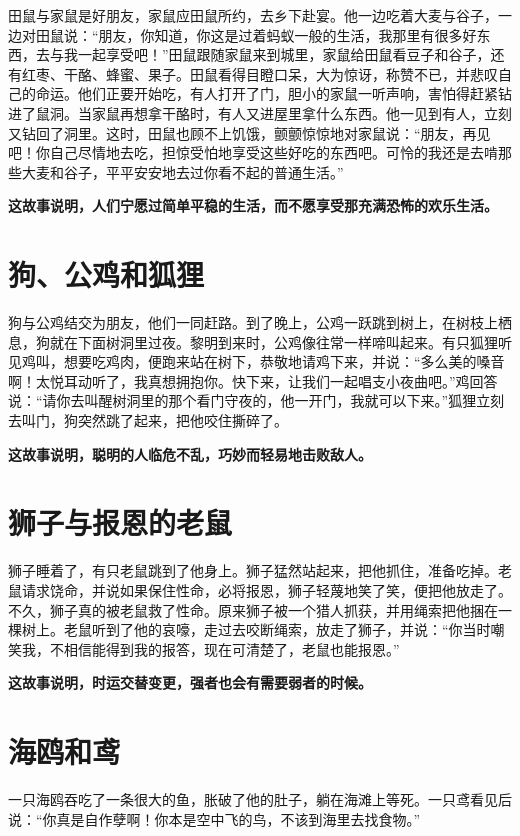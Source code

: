 田鼠与家鼠是好朋友，家鼠应田鼠所约，去乡下赴宴。他一边吃着大麦与谷子，一边对田鼠说：“朋友，你知道，你这是过着蚂蚁一般的生活，我那里有很多好东西，去与我一起享受吧！”田鼠跟随家鼠来到城里，家鼠给田鼠看豆子和谷子，还有红枣、干酪、蜂蜜、果子。田鼠看得目瞪口呆，大为惊讶，称赞不已，并悲叹自己的命运。他们正要开始吃，有人打开了门，胆小的家鼠一听声响，害怕得赶紧钻进了鼠洞。当家鼠再想拿干酪时，有人又进屋里拿什么东西。他一见到有人，立刻又钻回了洞里。这时，田鼠也顾不上饥饿，颤颤惊惊地对家鼠说：“朋友，再见吧！你自己尽情地去吃，担惊受怕地享受这些好吃的东西吧。可怜的我还是去啃那些大麦和谷子，平平安安地去过你看不起的普通生活。”

{\bfseries \color{red}这故事说明，人们宁愿过简单平稳的生活，而不愿享受那充满恐怖的欢乐生活。}

\section{狗、公鸡和狐狸}

狗与公鸡结交为朋友，他们一同赶路。到了晚上，公鸡一跃跳到树上，在树枝上栖息，狗就在下面树洞里过夜。黎明到来时，公鸡像往常一样啼叫起来。有只狐狸听见鸡叫，想要吃鸡肉，便跑来站在树下，恭敬地请鸡下来，并说：“多么美的嗓音啊！太悦耳动听了，我真想拥抱你。快下来，让我们一起唱支小夜曲吧。”鸡回答说：“请你去叫醒树洞里的那个看门守夜的，他一开门，我就可以下来。”狐狸立刻去叫门，狗突然跳了起来，把他咬住撕碎了。

{\bfseries \color{red}这故事说明，聪明的人临危不乱，巧妙而轻易地击败敌人。}

\section{狮子与报恩的老鼠}

狮子睡着了，有只老鼠跳到了他身上。狮子猛然站起来，把他抓住，准备吃掉。老鼠请求饶命，并说如果保住性命，必将报恩，狮子轻蔑地笑了笑，便把他放走了。不久，狮子真的被老鼠救了性命。原来狮子被一个猎人抓获，并用绳索把他捆在一棵树上。老鼠听到了他的哀嚎，走过去咬断绳索，放走了狮子，并说：“你当时嘲笑我，不相信能得到我的报答，现在可清楚了，老鼠也能报恩。”

{\bfseries \color{red}这故事说明，时运交替变更，强者也会有需要弱者的时候。}

\section{海鸥和鸢}

一只海鸥吞吃了一条很大的鱼，胀破了他的肚子，躺在海滩上等死。一只鸢看见后说：“你真是自作孽啊！你本是空中飞的鸟，不该到海里去找食物。”

